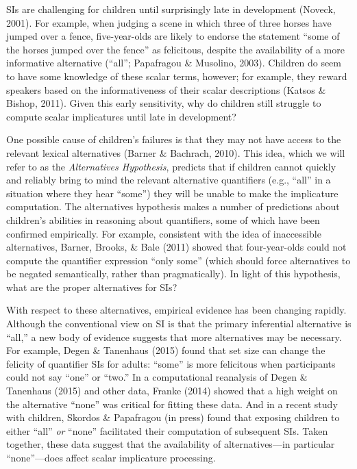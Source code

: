 \documentclass[10pt, letterpaper]{article}
\begin{document}
SIs are challenging for children until surprisingly late in development
(Noveck, 2001). For example, when judging a scene in which three of
three horses have jumped over a fence, five-year-olds are likely to
endorse the statement ``some of the horses jumped over the fence'' as
felicitous, despite the availability of a more informative alternative
(``all''; Papafragou \& Musolino, 2003). Children do seem to have some
knowledge of these scalar terms, however; for example, they reward
speakers based on the informativeness of their scalar descriptions
(Katsos \& Bishop, 2011). Given this early sensitivity, why do children
still struggle to compute scalar implicatures until late in development?

One possible cause of children's failures is that they may not have
access to the relevant lexical alternatives (Barner \& Bachrach, 2010).
This idea, which we will refer to as the \emph{Alternatives Hypothesis},
predicts that if children cannot quickly and reliably bring to mind the
relevant alternative quantifiers (e.g., ``all'' in a situation where
they hear ``some'') they will be unable to make the implicature
computation. The alternatives hypothesis makes a number of predictions
about children's abilities in reasoning about quantifiers, some of which
have been confirmed empirically. For example, consistent with the idea
of inaccessible alternatives, Barner, Brooks, \& Bale (2011) showed that
four-year-olds could not compute the quantifier expression ``only some''
(which should force alternatives to be negated semantically, rather than
pragmatically). In light of this hypothesis, what are the proper
alternatives for SIs?

With respect to these alternatives, empirical evidence has been changing
rapidly. Although the conventional view on SI is that the primary
inferential alternative is ``all,'' a new body of evidence suggests that
more alternatives may be necessary. For example, Degen \& Tanenhaus
(2015) found that set size can change the felicity of quantifier SIs for
adults: ``some'' is more felicitous when participants could not say
``one'' or ``two.'' In a computational reanalysis of Degen \& Tanenhaus
(2015) and other data, Franke (2014) showed that a high weight on the
alternative ``none'' was critical for fitting these data. And in a
recent study with children, Skordos \& Papafragou (in press) found that
exposing children to either ``all'' \emph{or} ``none'' facilitated their
computation of subsequent SIs. Taken together, these data suggest that
the availability of alternatives---in particular ``none''---does affect
scalar implicature processing.
\end{document}
